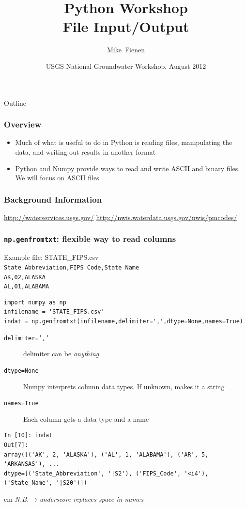 \documentclass{beamer}
\title[]{Python Workshop\\
File Input/Output}
\author[Fienen] %
{Mike~Fienen}
\institute[USGS] %
{
  U.S. Geological Survey\\
  Wisconsin Water Science Center, Middleton, Wisconsin USA
  }
\date[UQ12] %
{USGS National Groundwater Workshop, August 2012}
\begin{document}
\begin{frame}
  \titlepage
\end{frame}

\begin{frame}{Outline}
\tableofcontents
\end{frame}

\begin{frame}[fragile]
\frametitle{Overview}
\begin{itemize}

\item Much of what is useful to do in Python is reading files, manipulating the data, and writing out results in another format
\item Python and Numpy provide ways to read and write ASCII and binary files. We will focus on ASCII files
\end{itemize}
\end{frame}

\begin{frame}[fragile]
\frametitle{Background Information}
\url{http://waterservices.usgs.gov/}
\url{http://nwis.waterdata.usgs.gov/nwis/pmcodes/}
\end{frame}

\begin{frame}[fragile]
\frametitle{\texttt{np.genfromtxt}: flexible way to read columns}
Example file: STATE\_FIPS.csv \\
\texttt{State Abbreviation,FIPS Code,State Name} \\
\texttt{AK,02,ALASKA} \\
\texttt{AL,01,ALABAMA}  \\
\pause
\begin{lstlisting}
import numpy as np
infilename = 'STATE_FIPS.csv'
indat = np.genfromtxt(infilename,delimiter=',',dtype=None,names=True)
\end{lstlisting}
\pause
\begin{description}
\item[\texttt{delimiter=','}] delimiter can be \emph{anything}
\item[\texttt{dtype=None}] Numpy interprets column data types. If unknown, makes it a string
\item[\texttt{names=True}] Each column gets a data type and a name
\end{description}
\pause
\begin{lstlisting}
In [10]: indat
Out[7]: 
array([('AK', 2, 'ALASKA'), ('AL', 1, 'ALABAMA'), ('AR', 5, 'ARKANSAS'), ... 
dtype=[('State_Abbreviation', '|S2'), ('FIPS_Code', '<i4'), ('State_Name', '|S20')])
\end{lstlisting}
\pause
{} cm \emph{N.B.$\rightarrow$underscore replaces space in names}
\end{frame}
\end{document}

